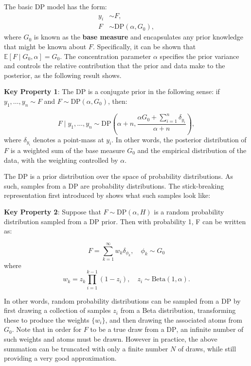 \documentclass[nojss]{jss}
\begin{document}
The basic DP model has the form:
\begin{align*}
y_i & \sim F, \\
F & \sim \text{DP} (\alpha, G_0),
\end{align*}
where $G_0$ is known as the \textbf{base measure} and encapsulates any prior knowledge that might be known about $F$.  Specifically, it can be shown that $\mathbb{E}[F \mid G_0,\alpha] = G_0$. The concentration parameter $\alpha$ specifies the prior variance and controls the relative contribution that the prior and data make to the posterior, as the following result shows.

\begin{tcolorbox}

\textbf{Key Property 1}: The DP is a conjugate prior in the following sense: if $y_1,\ldots,y_n \sim F$ and $F \sim \text{DP} (\alpha, G_0)$, then:

$$F \mid y_1,\ldots,y_n \sim \text{DP} \left( \alpha + n, \frac{\alpha G_0 + \sum_{i=1}^n \delta_{y_i}}{\alpha+n}\right),$$
where $\delta_{y_i}$ denotes a point-mass at $y_i$. In other words, the posterior distribution of $F$ is a weighted sum of the base measure $G_0$ and the empirical distribution of the data, with the weighting controlled by $\alpha$.

\end{tcolorbox}

The DP is a prior distribution over the space of probability distributions. As such, samples from a DP are probability distributions. The stick-breaking representation first introduced by \cite{sethuraman_constructive_1994} shows what such samples look like:

\begin{tcolorbox}

\textbf{Key Property 2}:
Suppose that $F \sim \text{DP} (\alpha, H)$ is a random probability distribution sampled from a DP prior. Then with probability 1, F can be written as:

$$F = \sum_{k=1}^\infty w_k \delta_{\phi_k}, \quad \phi_k \sim G_0$$
where
$$w_k = z_k \prod_{i=1}^{k-1} (1-z_i),\quad z_i \sim \text{Beta}(1,\alpha).$$

\end{tcolorbox}

In other words, random probability distributions can be sampled from a DP by first drawing a collection of samples ${z_i}$ from a Beta distribution, transforming these to produce the weights $\{w_i\}$, and then drawing the associated atoms from $G_0$. Note that in order for $F$ to be a true draw from a $\text{DP}$, an infinite number of such weights and atoms must be drawn. However in practice, the above summation can be truncated with only a finite number $N$ of draws, while still providing a very good approximation.
\end{document}
